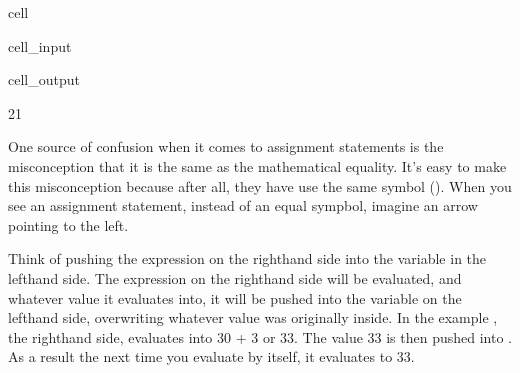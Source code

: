 \documentclass[letterpaper,10pt,english]{jupyterBook}
\begin{document}
\begin{sphinxuseclass}{cell}\begin{sphinxVerbatimInput}

\begin{sphinxuseclass}{cell_input}
\begin{sphinxVerbatim}[commandchars=\\\{\}]
    
\end{sphinxVerbatim}

\end{sphinxuseclass}\end{sphinxVerbatimInput}
\begin{sphinxVerbatimOutput}

\begin{sphinxuseclass}{cell_output}
\begin{sphinxVerbatim}[commandchars=\\\{\}]
21
\end{sphinxVerbatim}

\end{sphinxuseclass}\end{sphinxVerbatimOutput}

\end{sphinxuseclass}
\sphinxAtStartPar
One source of confusion when it comes to assignment statements is the misconception that it is the same as the mathematical equality. It’s easy to make this misconception because after all, they have use the same symbol (\sphinxcode{\sphinxupquote{=}}). When you see an assignment statement, instead of an equal sympbol, imagine an arrow pointing to the left.

\begin{sphinxVerbatim}[commandchars=\\\{\}]
    
\end{sphinxVerbatim}

\sphinxAtStartPar
Think of pushing the expression on the right\sphinxhyphen{}hand side into the variable in the left\sphinxhyphen{}hand side. The expression on the right\sphinxhyphen{}hand side will be evaluated, and whatever value it evaluates into, it will be pushed into the variable on the left\sphinxhyphen{}hand side, overwriting whatever value was originally inside. In the example , the right\sphinxhyphen{}hand side, evaluates into 30 + 3 or 33. The value 33 is then pushed into . As a result the next time you evaluate  by itself, it evaluates to 33.
\end{document}
